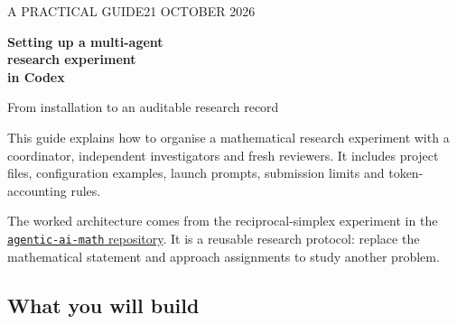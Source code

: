 \documentclass[11pt,a4paper]{article}
\begin{document}
\thispagestyle{empty}
{\sffamily\small\color{teal}A PRACTICAL GUIDE\hfill 21 OCTOBER 2026}
\vspace{15mm}

{\sffamily\bfseries\fontsize{29}{34}\selectfont\color{ink}Setting up a multi-agent\\research experiment\\in Codex\par}
\vspace{5mm}
{\Large\color{muted}From installation to an auditable research record\par}
\vspace{8mm}

This guide explains how to organise a mathematical research experiment with a coordinator, independent investigators and fresh reviewers. It includes project files, configuration examples, launch prompts, submission limits and token-accounting rules.

The worked architecture comes from the reciprocal-simplex experiment in the \href{https://github.com/MathisRost/agentic-ai-math/tree/main/experiments/reciprocal-simplex-astra6}{\texttt{agentic-ai-math} repository}. It is a reusable research protocol: replace the mathematical statement and approach assignments to study another problem.

\subsection*{What you will build}
\begin{center}
\end{center}
\end{document}
